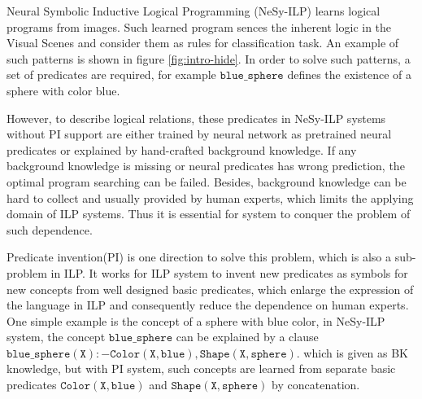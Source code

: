 \documentclass[
]{ceurart}
\begin{document}


Neural Symbolic Inductive Logical Programming (NeSy-ILP) learns logical programs from images. 
Such learned program sences the inherent logic in the Visual Scenes and consider them as rules for classification task.  An example of such patterns is shown in figure \ref{fig:intro-hide}. In order to solve such patterns, a set of predicates are required, for example $\mathtt{blue\_sphere} $ defines the existence of a sphere with color blue. 

However, to describe logical relations, these predicates in NeSy-ILP systems without PI support are either trained by neural network as pretrained neural predicates or explained by hand-crafted background knowledge. 
If any background knowledge is missing or neural predicates has wrong prediction, the optimal program searching can be failed. Besides, background knowledge can be hard to collect and usually provided by human experts, which limits the applying domain of ILP systems. Thus it is essential for system to conquer the problem of such dependence.

Predicate invention(PI)\cite{pi1988} is one direction to solve this problem, which is also a sub-problem in ILP. It works for ILP system to invent new predicates as symbols for new concepts from well designed basic predicates, which enlarge the expression of the language in ILP and consequently reduce the dependence on human experts. 
One simple example is the concept of a sphere with blue color, in NeSy-ILP system, the concept $ \mathtt{blue\_sphere} $ can be explained by a clause $\mathtt{blue\_sphere(X):-Color(X,blue),Shape(X,sphere).} $ which is given as BK knowledge, but with PI system, such concepts are learned from separate basic predicates $ \mathtt{Color(X,blue)} $ and $ \mathtt{Shape(X,sphere)} $ by concatenation. 


\end{document}
